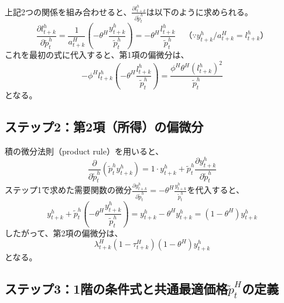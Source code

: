 上記2つの関係を組み合わせると、\(\frac{\partial l_{t+k}^h}{\partial\widetilde{p}_t^h}\)は以下のように求められる。
\begin{equation}
\frac{\partial l_{t+k}^h}{\partial\widetilde{p}_t^h}=\frac{1}{a_{t+k}^H}\left(-\theta^H\frac{y_{t+k}^h}{\widetilde{p}_t^h}\right)=-\theta^H\frac{l_{t+k}^h}{\widetilde{p}_t^h}\quad（\because y_{t+k}^h/a_{t+k}^H=l_{t+k}^h）
\label{eq:appendix_optimal_price_derivation_foc_sub1_labor_final}
\end{equation}
これを最初の式に代入すると、第1項の偏微分は、
\begin{equation}
-\phi^Hl_{t+k}^h\left(-\theta^H\frac{l_{t+k}^h}{\widetilde{p}_t^h}\right)=\frac{\phi^H\theta^H(l_{t+k}^h)^2}{\widetilde{p}_t^h}
\label{eq:appendix_optimal_price_derivation_foc_sub1_term1_result}
\end{equation}
となる。

\subsection*{ステップ2：第2項（所得）の偏微分}
\label{sec:appendix_optimal_price_derivation_foc_sub2}
積の微分法則（product rule）を用いると、
\begin{equation}
\frac{\partial}{\partial\widetilde{p}_t^h}\left(\widetilde{p}_t^hy_{t+k}^h\right)=1\cdot y_{t+k}^h+\widetilde{p}_t^h\frac{\partial y_{t+k}^h}{\partial\widetilde{p}_t^h}
\label{eq:appendix_optimal_price_derivation_foc_sub2_income_step}
\end{equation}
ステップ1で求めた需要関数の微分\(\frac{\partial y_{t+k}^h}{\partial\widetilde{p}_t^h}=-\theta^H\frac{y_{t+k}^h}{\widetilde{p}_t^h}\)を代入すると、
\begin{equation}
y_{t+k}^h+\widetilde{p}_t^h\left(-\theta^H\frac{y_{t+k}^h}{\widetilde{p}_t^h}\right)=y_{t+k}^h-\theta^Hy_{t+k}^h=(1-\theta^H)y_{t+k}^h
\label{eq:appendix_optimal_price_derivation_foc_sub2_income_result}
\end{equation}
したがって、第2項の偏微分は、
\begin{equation}
\lambda_{t+k}^H(1-\tau_{t+k}^H)(1-\theta^H)y_{t+k}^h
\label{eq:appendix_optimal_price_derivation_foc_sub2_term2_result}
\end{equation}
となる。

\subsection*{ステップ3：1階の条件式と共通最適価格\(\widetilde{p}_t^H\)の定義}
\label{sec:appendix_optimal_price_derivation_foc_sub3}

